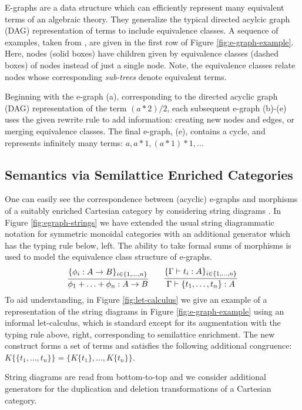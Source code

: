 E-graphs are a data structure which can efficiently represent many equivalent terms of an algebraic theory. They generalize the typical directed acylcic graph (DAG) representation of terms to include equivalence classes. 
A sequence of examples, taken from \cite{EggPaper}, are given in the first row of Figure \ref{fig:e-graph-example}. Here, nodes (solid boxes) have children given by equivalence classes (dashed boxes) of nodes instead of just a single node. Note, the equivalence classes relate nodes whose corresponding \textit{sub-trees} denote equivalent terms. 

Beginning with the e-graph (a), corresponding to the directed acyclic graph (DAG) representation of the term $(a*2)/2$, each subsequent e-graph (b)-(e) uses the given rewrite rule to add information: creating new nodes and edges, or merging equivalence classes. The final e-graph, (e), contains a cycle, and represents infinitely many terms: $a, a*1, (a*1)*1, $... 

\subsection*{Semantics via Semilattice Enriched Categories}

One can easily see the correspondence between (acyclic) e-graphs and morphisms of a suitably enriched Cartesian category by considering string diagrams 
\cite{noauthor_09083347_nodate,joyal_geometry_1991, mellies_functorial_2006}. In Figure \ref{fig:egraph-strings} we have extended the usual string diagrammatic notation for symmetric monoidal categories with an additional generator which has the  typing rule below, left.
The ability to take formal sums of morphisms is used to model the equivalence class structure of e-graphs.  
\[
\infer{\phi_1 + \ldots + \phi_n: A \to B}{\{\phi_i: A \to B\}_{i \in \{1,\ldots,n\}}}
\qquad
\infer{\Gamma \vdash \{t_1, \ldots, t_n\}: A}{\{\Gamma \vdash t_i: A\}_{i \in \{1, \ldots, n\}}}
\]
To aid understanding, in Figure \ref{fig:let-calculus} we give an example of a representation of the string diagrams in Figure \ref{fig:e-graph-example} using an informal let-calculus, which is standard except for its augmentation with the typing rule above, right, corresponding to semilattice enrichment. The new construct forms a set of terms and satisfies the following additional congruence: $K\{\{t_1, \ldots, t_n\}\} = \{K\{t_1\}, \ldots, K\{t_n\}\}$. 

String diagrams are read from bottom-to-top and we consider additional generators for the duplication and deletion transformations of a Cartesian category.  

